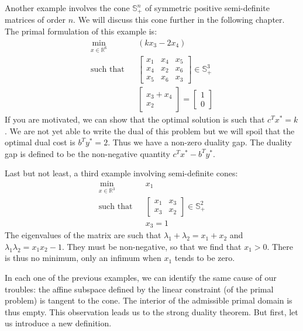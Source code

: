 Another example involves the cone $\mathbb{S}^n_+$ of symmetric positive semi-definite matrices of order $n$. We will discuss this cone further in the following chapter. The primal formulation of this example is:
\begin{eqnarray*}
\min_{x\in\mathbb{R}^6} & & (kx_3 - 2x_4)  \\
\text{such that} & & \left[\begin{array}{ccc} x_1 & x_4 & x_5 \\ x_4 & x_2 & x_6 \\ x_5 & x_6 & x_3 \end{array}\right] \in \mathbb{S}^3_+ \\
 & & \left[\begin{array}{c} x_3 + x_4 \\ x_2 \end{array}\right] = \left[\begin{array}{c} 1 \\ 0 \end{array}\right]
\end{eqnarray*}
If you are motivated, we can show that the optimal solution is such that $c^Tx^* = k$. We are not yet able to write the dual of this problem but we will spoil that the optimal dual cost is $b^Ty^* = 2$. Thus we have a non-zero duality gap. The duality gap is defined to be the non-negative quantity $c^Tx^* - b^Ty^*$.

Last but not least, a third example involving semi-definite cones:
\begin{eqnarray*}
 \min_{x\in\mathbb{R}^3} & & x_1 \\
 \text{such that} & & \left[\begin{array}{cc} x_1 & x_3 \\ x_3 & x_2 \end{array}\right] \in \mathbb{S}^2_+ \\
& & x_3 = 1 
\end{eqnarray*}
The eigenvalues of the matrix are such that $\lambda_1 + \lambda_2 = x_1 + x_2$ and $\lambda_1\lambda_2 = x_1x_2 - 1$. They must be non-negative, so that we find that $x_1>0$. There is thus no minimum, only an infimum when $x_1$ tends to be zero.

In each one of the previous examples, we can identify the same cause of our troubles: the affine subspace defined by the linear constraint (of the primal problem) is tangent to the cone. The interior of the admissible primal domain is thus empty. This observation leads us to the strong duality theorem. But first, let us introduce a new definition.

